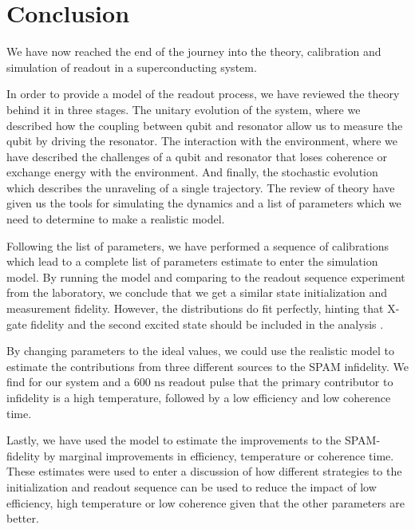 \chapter{Conclusion}\label{chap:conclusion}
We have now reached the end of the journey into the theory, calibration and simulation of readout in a superconducting system. 

In order to provide a model of the readout process, we have reviewed the theory behind it in three stages. The unitary evolution of the system, where we described how the coupling between qubit and resonator allow us to measure the qubit by driving the resonator. The interaction with the environment, where we have described the challenges of a qubit and resonator that loses coherence or exchange energy with the environment. And finally, the stochastic evolution which describes the unraveling of a single trajectory. The review of theory have given us the tools for simulating the dynamics and a list of parameters which we need to determine to make a realistic model.

Following the list of parameters, we have performed a sequence of calibrations which lead to a complete list of parameters estimate to enter the simulation model. By running the model and comparing to the readout sequence experiment from the laboratory, we conclude that we get a similar state initialization and measurement fidelity. However, the distributions do fit perfectly, hinting that X-gate fidelity and the second excited state should be included in the analysis . 

By changing parameters to the ideal values, we could use the realistic model to estimate the contributions from three different sources to the SPAM infidelity. We find for our system and a $600 \text{ ns}$ readout pulse that the primary contributor to infidelity is a high temperature, followed by a low efficiency and low coherence time.

Lastly, we have used the model to estimate the improvements to the SPAM-fidelity by marginal improvements in efficiency, temperature or coherence time. These estimates were used to enter a discussion of how different strategies to the initialization and readout sequence can be used to reduce the impact of low efficiency, high temperature or low coherence given that the other parameters are better. 






